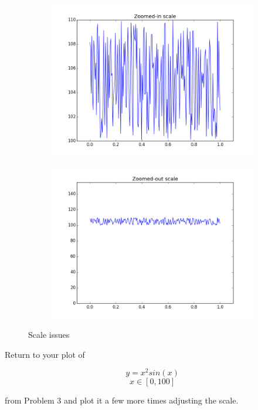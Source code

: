 \begin{figure}
\centering
\begin{subfigure}{.5\textwidth}
  \centering
  \includegraphics[width=\textwidth]{scale_line_zoomed_in.png}
\end{subfigure}%
\begin{subfigure}{.5\textwidth}
  \centering
  \includegraphics[width=\textwidth]{scale_line_zoomed_out.png}
\end{subfigure}
\caption{Scale issues}
\label{fig:line_scale}
\end{figure}



\begin{problem}
Return to your plot of 

$$y = x^2sin(x)$$ $$x\in[0,100]$$

from Problem 3 and plot it a few more times adjusting the scale. 
\end{problem}



